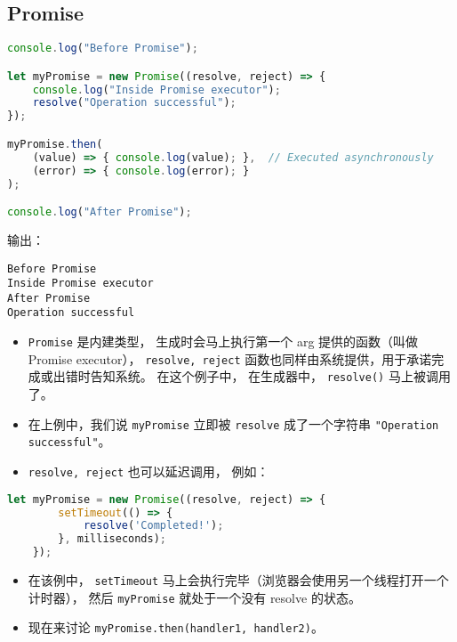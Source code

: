 

\subsection{Promise}
\begin{lstlisting}[language=js]
console.log("Before Promise");

let myPromise = new Promise((resolve, reject) => {
    console.log("Inside Promise executor");
    resolve("Operation successful");
});

myPromise.then(
    (value) => { console.log(value); },  // Executed asynchronously
    (error) => { console.log(error); }
);

console.log("After Promise");
\end{lstlisting}
输出：
\begin{lstlisting}[language=none]
Before Promise
Inside Promise executor
After Promise
Operation successful
\end{lstlisting}

\begin{itemize}
\item \verb`Promise` 是内建类型， 生成时会马上执行第一个 arg 提供的函数（叫做 Promise executor）， \verb`resolve, reject` 函数也同样由系统提供，用于承诺完成或出错时告知系统。 在这个例子中， 在生成器中， \verb`resolve()` 马上被调用了。
\item 在上例中，我们说 \verb`myPromise` 立即被 \verb`resolve` 成了一个字符串 \verb`"Operation successful"`。
\item \verb`resolve, reject` 也可以延迟调用， 例如：
\end{itemize}
\begin{lstlisting}[language=js]
let myPromise = new Promise((resolve, reject) => {
        setTimeout(() => {
            resolve('Completed!');
        }, milliseconds);
    });
\end{lstlisting}
\begin{itemize}
\item 在该例中， \verb`setTimeout` 马上会执行完毕（浏览器会使用另一个线程打开一个计时器）， 然后 \verb`myPromise` 就处于一个没有 resolve 的状态。
\end{itemize}
\begin{itemize}
\item 现在来讨论 \verb`myPromise.then(handler1, handler2)`。
\end{itemize}
